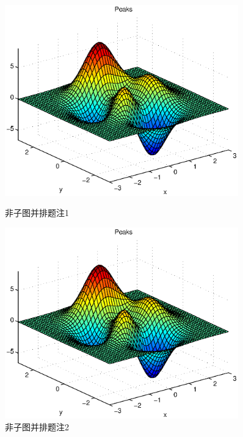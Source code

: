 \documentclass{article}
\begin{document}
    \begin{figure}[!htbp]
        \centering
        \begin{minipage}[b]{0.45\linewidth}
            \centering
            \includegraphics[width=0.9\textwidth]{example}
            \caption{非子图并排题注1}
            \label{}
        \end{minipage}%
        \begin{minipage}[b]{0.45\linewidth}
            \centering
            \includegraphics[width=0.9\textwidth]{example}
            \caption{非子图并排题注2}
            \label{}
        \end{minipage}
    \end{figure}
\end{document}
